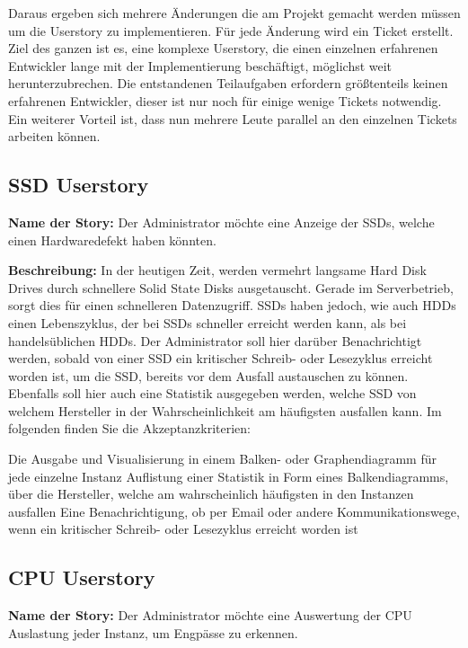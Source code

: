 Daraus ergeben sich mehrere Änderungen die am Projekt gemacht werden müssen um
die Userstory zu implementieren. Für jede Änderung wird ein Ticket erstellt.
Ziel des ganzen ist es, eine komplexe Userstory, die einen einzelnen
erfahrenen Entwickler lange mit der Implementierung beschäftigt, möglichst weit
herunterzubrechen. Die entstandenen Teilaufgaben erfordern größtenteils keinen
erfahrenen Entwickler, dieser ist nur noch für einige wenige Tickets notwendig.
Ein weiterer Vorteil ist, dass nun mehrere Leute parallel an den einzelnen
Tickets arbeiten können.
\tm%

\subsection{SSD Userstory}
\textbf{Name der Story:} Der Administrator möchte eine Anzeige der SSDs, welche
einen Hardwaredefekt haben könnten.

\textbf{Beschreibung:} In der heutigen Zeit, werden vermehrt langsame
Hard Disk Drives durch schnellere Solid State Disks ausgetauscht. Gerade im
Serverbetrieb, sorgt dies für einen schnelleren Datenzugriff. SSDs haben
jedoch, wie auch HDDs einen Lebenszyklus, der bei SSDs schneller erreicht
werden kann, als bei handelsüblichen HDDs. Der Administrator soll hier darüber
Benachrichtigt werden, sobald von einer SSD ein kritischer Schreib- oder
Lesezyklus erreicht worden ist, um die SSD, bereits vor dem Ausfall austauschen
zu können. Ebenfalls soll hier auch eine Statistik ausgegeben werden, welche
SSD von welchem Hersteller in der Wahrscheinlichkeit am häufigsten ausfallen
kann. Im folgenden finden Sie die Akzeptanzkriterien:

\begin{outline}
  \1 Die Ausgabe und Visualisierung in einem Balken- oder Graphendiagramm
  für jede einzelne Instanz
  \1 Auflistung einer Statistik in Form eines Balkendiagramms, über die
  Hersteller, welche am wahrscheinlich häufigsten in den Instanzen ausfallen
  \1 Eine Benachrichtigung, ob per Email oder andere Kommunikationswege,
  wenn ein kritischer Schreib- oder Lesezyklus erreicht worden ist
\end{outline}
\mr%

\subsection{CPU Userstory}
\textbf{Name der Story:} Der Administrator möchte eine Auswertung der CPU
Auslastung jeder Instanz, um Engpässe zu erkennen.

